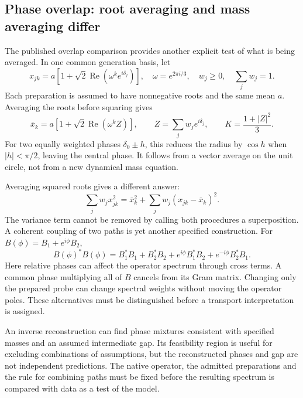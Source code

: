 \subsection{Phase overlap: root averaging and mass averaging differ}
The published overlap comparison provides another explicit test of
what is being averaged. In one common generation basis, let
\begin{equation}
 x_{jk}=a[1+\sqrt2\operatorname{Re}(\omega^ke^{i\delta_j})],
 \quad \omega=e^{2\pi i/3},\quad
 w_j\geq0,\quad\sum_jw_j=1.
\end{equation}
Each preparation is assumed to have nonnegative roots and the same
mean $a$. Averaging the roots before squaring gives
\begin{equation}
 \overline x_k=a[1+\sqrt2\operatorname{Re}(\omega^k Z)],
 \qquad Z=\sum_jw_je^{i\delta_j},\qquad
 K=\frac{1+|Z|^2}{3}.
\end{equation}
For two equally weighted phases $\delta_0\pm h$, this reduces the
radius by $\cos h$ when $|h|<\pi/2$, leaving the central phase.
It follows from a vector average on the unit circle, not from a
new dynamical mass equation.

Averaging squared roots gives a different answer:
\begin{equation}
 \sum_jw_jx_{jk}^2=\overline x_k^2+
                      \sum_jw_j(x_{jk}-\overline x_k)^2.
\end{equation}
The variance term cannot be removed by calling both procedures a
superposition. A coherent coupling of two paths is yet another
specified construction. For $B(\phi)=B_1+e^{i\phi}B_2$,
\begin{equation}
 B(\phi)^*B(\phi)=B_1^*B_1+B_2^*B_2+
 e^{i\phi}B_1^*B_2+e^{-i\phi}B_2^*B_1.
\end{equation}
Here relative phases can affect the operator spectrum through cross
terms. A common phase multiplying all of $B$ cancels from its Gram
matrix. Changing only the prepared probe can change spectral weights
without moving the operator poles. These alternatives must be
distinguished before a transport interpretation is assigned.

An inverse reconstruction can find phase mixtures consistent with
specified masses and an assumed intermediate gap. Its feasibility
region is useful for excluding combinations of assumptions, but the
reconstructed phases and gap are not independent predictions. The
native operator, the admitted preparations and the rule for combining
paths must be fixed before the resulting spectrum is compared with
data as a test of the model.

